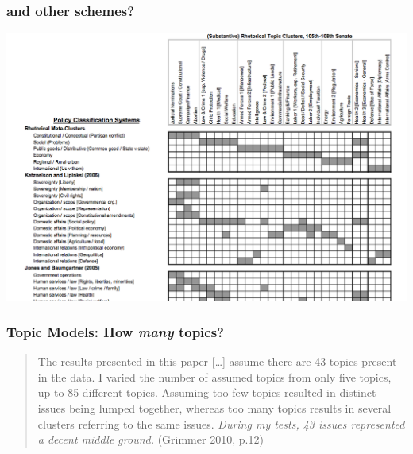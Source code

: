 \documentclass[11pt,compress,professionalfonts]{beamer}
\begin{document}
\begin{frame}[t]\frametitle{and other schemes?}

\centerline{\includegraphics[scale=.5]{pictures/other-schemes}}

%
%
%
%
%

\end{frame}
\begin{frame}[t]\frametitle{Topic Models: How \textit{many} topics?}

{\small
\begin{quote}
The results presented in this paper [\ldots] assume there are 43 topics present in the data. I varied the number of assumed topics from only five topics, up to 85 different topics. Assuming too few topics resulted in distinct issues being lumped together, whereas too many topics results in several clusters referring to the same issues. \textsl{During my tests, 43 issues represented a decent middle ground.}
(Grimmer 2010, p.12)
\end{quote}
}

\end{frame}
\end{document}
